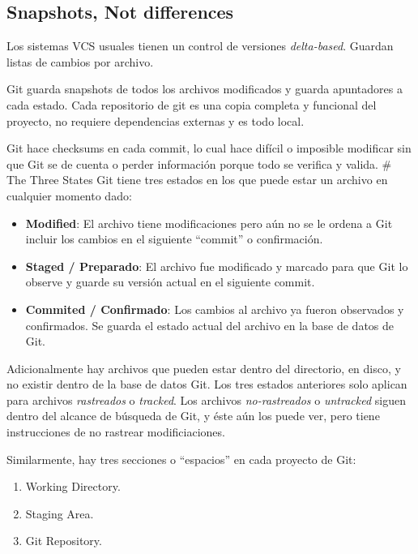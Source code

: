 \documentclass[spanish, 12pt, a4paper]{article}
\begin{document}
\subsection{Snapshots, Not differences}

Los sistemas VCS usuales tienen un control de versiones
\emph{delta-based}. Guardan listas de cambios por archivo.

Git guarda snapshots de todos los archivos modificados y guarda
apuntadores a cada estado. Cada repositorio de git es una copia completa
y funcional del proyecto, no requiere dependencias externas y es todo
local.

Git hace checksums en cada commit, lo cual hace difícil o imposible
modificar sin que Git se de cuenta o perder información porque todo se
verifica y valida. \# The Three States Git tiene tres estados en los que
puede estar un archivo en cualquier momento dado:

\begin{itemize}
\item
  \textbf{Modified}: El archivo tiene modificaciones pero aún no se le
  ordena a Git incluir los cambios en el siguiente ``commit'' o
  confirmación.
\item
  \textbf{Staged / Preparado}: El archivo fue modificado y marcado para
  que Git lo observe y guarde su versión actual en el siguiente commit.
\item
  \textbf{Commited / Confirmado}: Los cambios al archivo ya fueron
  observados y confirmados. Se guarda el estado actual del archivo en la
  base de datos de Git.
\end{itemize}

Adicionalmente hay archivos que pueden estar dentro del directorio, en
disco, y no existir dentro de la base de datos Git. Los tres estados
anteriores solo aplican para archivos \emph{rastreados} o
\emph{tracked}. Los archivos \emph{no-rastreados} o \emph{untracked}
siguen dentro del alcance de búsqueda de Git, y éste aún los puede ver,
pero tiene instrucciones de no rastrear modificiaciones.

Similarmente, hay tres secciones o ``espacios'' en cada proyecto de Git:

\begin{enumerate}
\def\labelenumi{\arabic{enumi}.}
\item
  Working Directory.
\item
  Staging Area.
\item
  Git Repository.
\end{enumerate}
\end{document}
